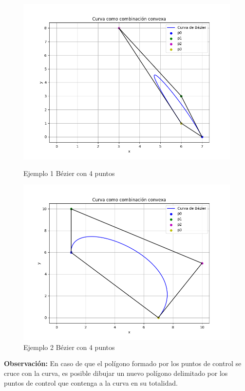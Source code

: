 \documentclass{article}
\begin{document}
\begin{figure}[H]
\begin{minipage}{0.45\textwidth}
        \includegraphics[width=\textwidth]{imagenes/3b3.png}
        \caption{Ejemplo 1 Bézier con 4 puntos}
        \label{fig:grafico3}
    \end{minipage}
\begin{minipage}{0.45\textwidth}
        \centering
        \includegraphics[width=\textwidth]{imagenes/3b4.png}
        \caption{Ejemplo 2 Bézier con 4 puntos}
        \label{fig:grafico3}
    \end{minipage}
    \label{fig:tres_graficos}
\end{figure}

\textbf{Observación:} En caso de que el polígono formado por los puntos de control se cruce con la curva, es posible dibujar un nuevo polígono delimitado por los puntos de control que contenga a la curva en su totalidad.
\end{document}
